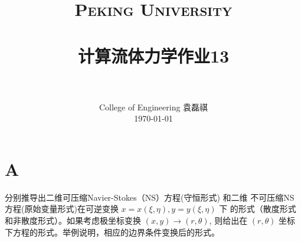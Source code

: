\documentclass[12pt]{article}
\title{
		\vspace{-1in} 	
		\usefont{OT1}{bch}{b}{n}
		\normalfont \normalsize \textsc{\LARGE Peking University}\\[0.2cm] %
		\horrule{0.5pt} \\[0.2cm]
		\huge \bfseries{计算流体力学作业13} \\[-0.2cm]
		\horrule{2pt} \\[0.2cm]
}
\author{
		\normalfont 								\normalsize
		College of Engineering \quad 2001111690  \quad 袁磊祺\\	\normalsize
        \today
}
\date{}
\begin{document}


\maketitle

\section{A}

分别推导出二维可压缩Navier-Stokes（NS）方程(守恒形式) 和二维
不可压缩NS方程(原始变量形式)在可逆变换 $x=x(\xi, \eta), y=y(\xi, \eta)$ 下 的形式（散度形式和非散度形式）。如果考虑极坐标变换 $(x, y) \rightarrow (r, \theta)$, 则给出在 $(r, \theta)$ 坐标下方程的形式。举例说明，相应的边界条件变换后的形式。
\end{document}
